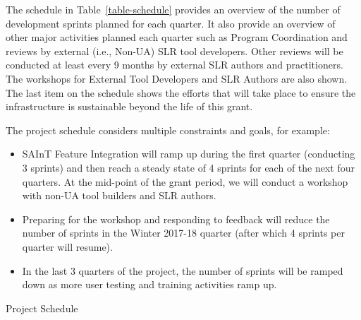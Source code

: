 The schedule in Table~\ref{table-schedule} provides an overview of the number of development sprints planned for each quarter.  
It also provide an overview of other major activities planned each quarter such as Program Coordination and reviews by external (i.e., Non-UA) SLR  tool developers.  
Other reviews will be conducted at least every 9 months by external SLR authors and practitioners. 
The workshops for External Tool Developers and SLR Authors are also shown.   
The last item on the schedule shows the efforts that will take place to ensure the infrastructure is sustainable beyond the life of this grant. 

The project schedule considers multiple constraints and goals, for example:
\vspace{-8pt}
\begin{itemize}
	\item SAInT Feature Integration will ramp up during the first quarter (conducting 3 sprints) and then reach a steady state of 4 sprints for each of the next four quarters.  
	At the mid-point of the grant period, we will conduct a workshop with non-UA tool builders and SLR authors.  
	\item Preparing for the workshop and responding to feedback will reduce the number of sprints in the Winter 2017-18 quarter (after which 4 sprints per quarter will resume).  
	\item In the last 3 quarters of the project, the number of sprints will be ramped down as more user testing and training activities ramp up.
	\vspace{-4pt}
\end{itemize}
\vspace{-4pt}

\begin{table}
	\centering
	\caption{Project Schedule}
	\label{table-schedule}
	
\end{table}